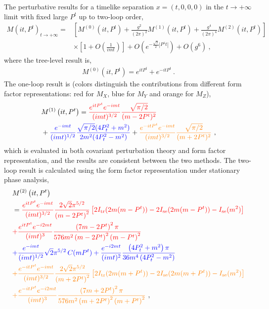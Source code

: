 \documentclass[a4paper,11pt]{article}
\begin{document}
The perturbative results for a timelike separation $x=(t,0,0,0)$ in the $t\rightarrow +\infty$ limit with fixed large $P^t$ up to two-loop order,
\begin{align}\label{eq:MLtphi3}
M\left(i t, P^t\right)_{t\rightarrow+\infty} 
= & \left[ M^{(0)}\left(i t, P^t\right) 
+ \frac{g^2}{(2\pi)^2} M^{(1)}\left(i t, P^t\right) 
+ \frac{g^4}{(2\pi)^4}  M^{(2)}\left(i t, P^t\right) \right] \nonumber\\
&\times \left[1+O\left(\frac{1}{i m t}\right)\right] 
+ O\left(e^{-\frac{\sqrt{3}}{2} | P^z t |}\right) +  O\left(g^6\right) \ ,
\end{align}
where the tree-level result is,
\begin{align}
M^{(0)}\left(i t, P^t\right) = e^{i t P^{t}} + e^{-i t P^t} \ .
\end{align}
The one-loop result is (colors distinguish the contributions from different form factor representations: {\color{red} red for $M_{X}$}, {\color{blue} blue for $M_{Y}$} and {\color{orange} orange for $M_{Z}$}),
\begin{align}\label{eq:MLt(1)phi3}
&M^{(1)}\left(i t, P^t\right) = 
{\color{red} \frac{e^{i t P^{t}} e^{-i m t}}{(i m t)^{3/2}} \frac{\sqrt{\pi/2}}{(m-2 P^t)^2} } \nonumber\\
&+ {\color{blue} \frac{e^{-i m t}}{(i m t)^{1/2}} \frac{\sqrt{\pi/2}(4P_t^2+m^2)}{2m^2(4P_t^2-m^2)} } 
+ {\color{orange} \frac{e^{-i t P^{t}} e^{-i m t}}{(i m t)^{3/2}} \frac{\sqrt{\pi/2}}{(m+2 P^t)^2} } \ ,
\end{align}
which is evaluated in both covariant perturbation theory and form factor representation, and the results are consistent between the two methods. 
The two-loop result is calculated using the form factor representation under stationary phase analysis,
\begin{align}\label{eq:MLt(2)phi3}
&M^{(2)}\left(i t, P^t\right) \nonumber\\
&= {\color{red} \frac{e^{i t P^{t}} e^{-i m t}}{(i m t)^{3/2}} \frac{2 \sqrt{2} \pi ^{5/2}}{\left(m-2 P^t\right)^2} \left[ 2 I_{\rm tr}(2m(m-P^t)) - 2 I_{\rm se}(2m(m-P^t)) - I_{\rm se}(m^2) \right] } \nonumber\\
&{\color{red}+\frac{e^{i t P^{t}} e^{-i 2 m t}}{(i m t)^{3}} \frac{\left(7 m-2 P^t\right)^2 \pi }{576 m^2 \left(m-2P^t\right)^2 \left(m-P^t\right)^2}}  \nonumber\\
&{\color{blue}+\frac{e^{-i m t}}{(i m t)^{1/2}} \sqrt{2} \pi^{5/2} \, C(m P^t) +\frac{e^{-i 2 m t}}{(i m t)^{2}}\frac{\left(4 P_t^2+m^2\right)\pi }{36 m^4 \left(4P_t^2-m^2\right)} }  \nonumber\\
&{\color{orange}+\frac{e^{-i t P^{t}} e^{-i m t}}{(i m t)^{3/2}} \frac{2 \sqrt{2} \pi ^{5/2}}{\left(m+2 P^t\right)^2} \left[ 2 I_{\rm tr}(2m(m+P^t)) - 2 I_{\rm se}(2m(m+P^t)) - I_{\rm se}(m^2) \right] } \nonumber\\
&{\color{orange}+\frac{e^{-i t P^{t}} e^{-i 2 m t}}{(i m t)^{3}} \frac{\left(7 m+2 P^t\right)^2 \pi }{576 m^2 \left(m+2P^t\right)^2 \left(m+P^t\right)^2}} \ ,
\end{align}
\end{document}
